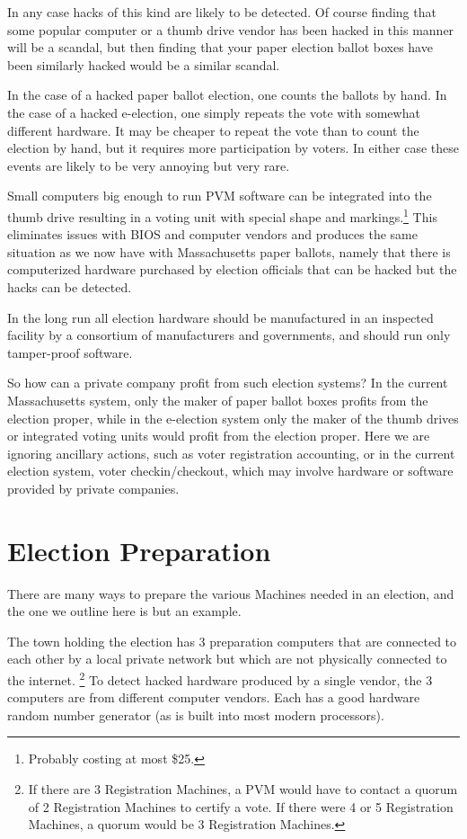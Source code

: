 \documentclass[12pt]{article}
\begin{document}
In any case hacks of this kind are likely to be detected.
Of course finding that some popular computer or a thumb drive
vendor has been hacked in this
manner will be a scandal, but then finding that your paper election
ballot boxes have been similarly hacked would be a similar scandal.

In the case of a hacked paper ballot election, one counts the
ballots by hand.  In the case of a hacked e-election, one simply
repeats the vote with somewhat different hardware.
It may be cheaper to repeat the vote
than to count the election by hand, but it requires more
participation by voters.  In either case these events are likely
to be very annoying but very rare.

Small computers big enough to run PVM software can be integrated
into the thumb drive resulting in a voting unit with special
shape and markings.\footnote{Probably costing at most \$25.}
This eliminates issues with BIOS and computer
vendors and produces the same situation as we now have with
Massachusetts paper ballots, namely that there is computerized
hardware purchased by election officials that can be hacked but
the hacks can be detected.

In the long run all election hardware should be manufactured in an
inspected facility by a consortium of manufacturers and governments,
and should run only tamper-proof software.

So how can a private company profit from such election systems?
In the current Massachusetts system, only the maker of paper ballot
boxes profits from the election proper, while in the e-election
system only the maker of the thumb drives or integrated voting units
would profit from the election proper.  Here we are ignoring
ancillary actions, such as voter registration accounting, or in
the current election system, voter checkin/checkout, which
may involve hardware or software provided by private companies.




\section{Election Preparation}

There are many ways to prepare the various Machines needed in an election,
and the one we outline here is but an example.

The town holding the election has 3 preparation computers
that are connected to each other by a local private network but which are not
physically connected to the internet.%
\footnote{If there are 3 Registration Machines,
a PVM would have to contact a quorum of 2 Registration Machines to
certify a vote.  If there were 4 or 5 Registration Machines,
a quorum would be 3 Registration Machines.}
To detect hacked hardware
produced by a single vendor, the 3 computers are from different
computer vendors.  Each has a good hardware random number generator
(as is built into most modern processors).
\end{document}
